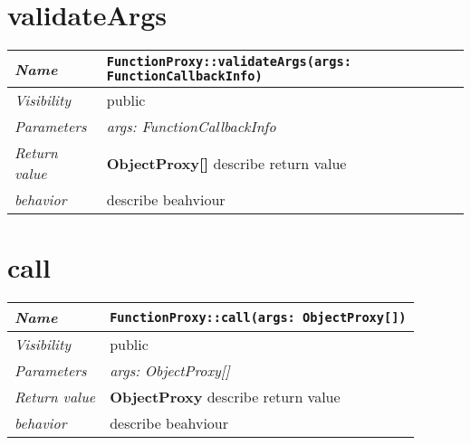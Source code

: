 \section{validateArgs}
\begin{longtable}{p{3cm} @{\hskip 1cm} p{12cm}}
	\hline

	\textit{Name} & \texttt{FunctionProxy::validateArgs(args: FunctionCallbackInfo)}\\
	\hline

	\textit{Visibility} & public\\
	\hline

	\textit{Parameters} & \textit{args: FunctionCallbackInfo}\\
	\hline

	\textit{Return value} & \textbf{ ObjectProxy[]} describe return value\\
	\hline

	\textit{behavior} & describe beahviour \\
	\hline

\end{longtable} \pagebreak

\section{call}
\begin{longtable}{p{3cm} @{\hskip 1cm} p{12cm}}
	\hline

	\textit{Name} & \texttt{FunctionProxy::call(args: ObjectProxy[])}\\
	\hline

	\textit{Visibility} & public\\
	\hline

	\textit{Parameters} & \textit{args: ObjectProxy[]}\\
	\hline

	\textit{Return value} & \textbf{ ObjectProxy} describe return value\\
	\hline

	\textit{behavior} & describe beahviour \\
	\hline

\end{longtable} \pagebreak
